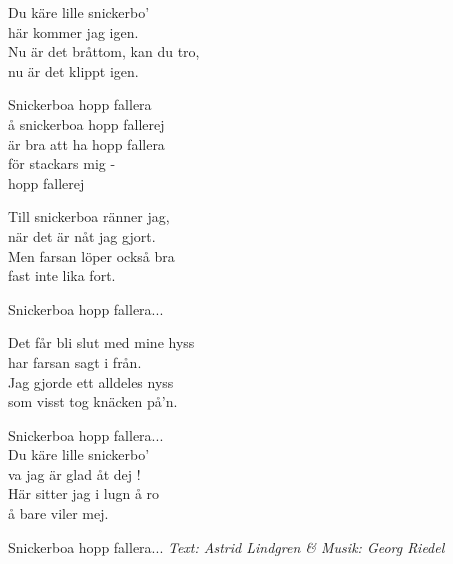 \vspace{10pt}
Du käre lille snickerbo'\\
här kommer jag igen.\\
Nu är det bråttom, kan du tro,\\
nu är det klippt igen.\par
\vspace{10pt}
Snickerboa hopp fallera\\
å snickerboa hopp fallerej\\
är bra att ha hopp fallera\\
för stackars mig -\\
hopp fallerej\par
\vspace{10pt}
Till snickerboa ränner jag,\\
när det är nåt jag gjort.\\
Men farsan löper också bra\\
fast inte lika fort.\par
\vspace{10pt}
Snickerboa hopp fallera...\par
\vspace{10pt}
Det får bli slut med mine hyss\\
har farsan sagt i från.\\
Jag gjorde ett alldeles nyss\\
som visst tog knäcken på'n.\par
\vspace{10pt}
Snickerboa hopp fallera...
\\
Du käre lille snickerbo'\\
va jag är glad åt dej !\\
Här sitter jag i lugn å ro\\
å bare viler mej.\par
\vspace{10pt}
Snickerboa hopp fallera...
\vspace{10pt}
{\footnotesize\textit{Text: Astrid Lindgren \& Musik: Georg Riedel}}
